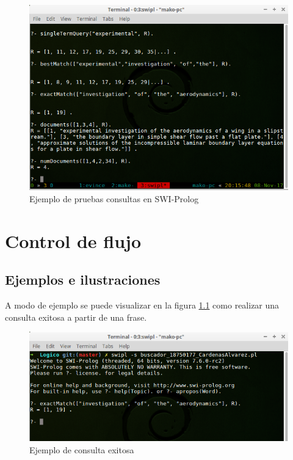 \documentclass[letterpaper,12pt]{report}
\begin{document}
\begin{figure}[H]
    \centering
    \includegraphics[width=1\textwidth]{test.png}
    \caption{Ejemplo de pruebas consultas en SWI-Prolog}
    \label{fig:test}
\end{figure}


\chapter{Control de flujo}

\section {Ejemplos e ilustraciones}

A modo de ejemplo se puede visualizar en la figura \ref{fig:success} como realizar una consulta exitosa a partir de una frase.

\begin{figure}[H]
    \centering
    \includegraphics[width=1\textwidth]{success.png}
    \caption{Ejemplo de consulta exitosa}
    \label{fig:success}
\end{figure}
\end{document}
